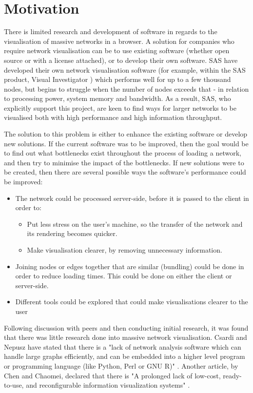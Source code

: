 \documentclass[../dissertation.tex]{subfiles}
\begin{document}
\chapter{Motivation}

There is limited research and development of software in regards to the visualisation of massive networks in a browser. A solution for companies who require network visualisation can be to use existing software (whether open source or with a license attached), or to develop their own software. SAS \cite{sas} have developed their own network visualisation software (for example, within the SAS product, Visual Investigator \cite{sasvi}) which performs well for up to a few thousand nodes, but begins to struggle when the number of nodes exceeds that - in relation to processing power, system memory and bandwidth. As a result, SAS, who explicitly support this project, are keen to find ways for larger networks to be visualised both with high performance and high information throughput.

The solution to this problem is either to enhance the existing software or develop new solutions. If the current software was to be improved, then the goal would be to find out what bottlenecks exist throughout the process of loading a network, and then try to minimise the impact of the bottlenecks. If new solutions were to be created, then there are several possible ways the software's performance could be improved:

\begin{itemize}
	\item The network could be processed server-side, before it is passed to the client in order to:
	\begin{itemize}
	    \item Put less stress on the user's machine, so the transfer of the network and its rendering becomes quicker.
	    \item Make visualisation clearer, by removing unnecessary information.
	\end{itemize}
	\item Joining nodes or edges together that are similar (bundling) could be done in order to reduce loading times. This could be done on either the client or server-side.
	\item Different tools could be explored that could make visualisations clearer to the user
\end{itemize}

Following discussion with peers and then conducting initial research, it was found that there was little research done into massive network visualisation. Csardi and Nepusz have stated that there is a "lack of network analysis software which can handle large graphs efficiently, and can be embedded into a higher level program or programming language (like Python, Perl or GNU R)" \cite{csardi2006igraph}. Another article, by Chen and Chaomei, declared that there is "A prolonged lack of low-cost, ready-to-use, and reconfigurable information visualization systems" \cite{chen2005top}. 
\end{document}
